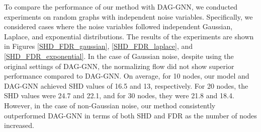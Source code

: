 \documentclass[10pt]{article}
\begin{document}
To compare the performance of our method with DAG-GNN, we conducted experiments on random graphs with independent noise variables. Specifically, we considered cases where the noise variables followed independent Gaussian, Laplace, and exponential distributions. The results of the experiments are shown in Figures \ref*{SHD_FDR_gaussian}, \ref*{SHD_FDR_laplace}, and \ref*{SHD_FDR_exponential}. In the case of Gaussian noise, despite using the original settings of DAG-GNN, the normalizing flow did not show superior performance compared to DAG-GNN. On average, for 10 nodes, our model and DAG-GNN achieved SHD values of 16.5 and 13, respectively. For 20 nodes, the SHD values were 24.7 and 22.1, and for 30 nodes, they were 21.8 and 18.4. However, in the case of non-Gaussian noise, our method consistently outperformed DAG-GNN in terms of both SHD and FDR as the number of nodes increased.
\end{document}
